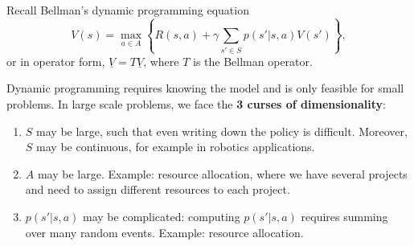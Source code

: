 %
\usetikzlibrary{calc}
\usetikzlibrary{shapes,arrows}
%
%
%
%
%
%
%
%

\newcommand{\weights}{\texttt{w}}
\newcommand{\ftrs}{\phi}
\newcommand{\FtrMtx}{\Phi}


Recall Bellman's dynamic programming equation
$$V(s) = \max_{a \in A} \left\{R(s,a) + \gamma \sum_{s' \in S} p(s'|s,a)V(s')\right\},$$
or in operator form, $\underline{V}=T\underline{V}$, where $T$ is the Bellman operator.

Dynamic programming requires knowing the model and is only feasible for small problems.
In large scale problems, we face the \textbf{3 curses of dimensionality}:

\begin{enumerate}
\item $S$ may be large, such that even writing down the policy is difficult. Moreover, $S$ may be continuous, for example in robotics applications.
\item $A$ may be large. Example: resource allocation, where we have several projects and need to assign different resources to each project.
\item $p(s'|s,a)$ may be complicated: computing $p(s'|s,a)$ requires summing over many random events. Example: resource allocation.
\end{enumerate}

